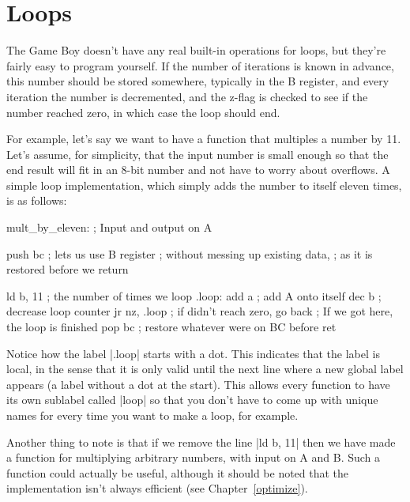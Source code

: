 \documentclass[11pt]{book}
\begin{document}
\section{Loops} 
\label{loops}
The Game Boy doesn't have any real built-in operations for loops, but they're fairly easy to program yourself. If the number of iterations is known in advance, this number should be stored somewhere, typically in the B register, and every iteration the number is decremented, and the z-flag is checked to see if the number reached zero, in which case the loop should end. 

For example, let's say we want to have a function that multiples a number by 11. Let's assume, for simplicity, that the input number is small enough so that the end result will fit in an 8-bit number and not have to worry about overflows. A simple loop implementation, which simply adds the number to itself eleven times, is as follows:

\begin{code}
mult_by_eleven:
  ; Input and output on A 
  
  push bc ; lets us use B register
  ; without messing up existing data, 
  ; as it is restored before we return 
  
  ld b, 11 ; the number of times we loop 
.loop:
  add a ; add A onto itself 
  dec b ; decrease loop counter 
  jr nz, .loop ; if didn't reach zero, go back
  ; If we got here, the loop is finished 
  pop bc ; restore whatever were on BC before 
  ret 
\end{code}
  
Notice how the label |.loop| starts with a dot. This indicates that the label is local, in the sense that it is only valid until the next line where a new global label appears (a label without a dot at the start). This allows every function to have its own sublabel called |loop| so that you don't have to come up with unique names for every time you want to make a loop, for example.

Another thing to note is that if we remove the line |ld b, 11| then we have made a function for multiplying arbitrary numbers, with input on A and B. Such a function could actually be useful, although it should be noted that the implementation isn't always efficient (see Chapter~\ref{optimize}).
\end{document}
